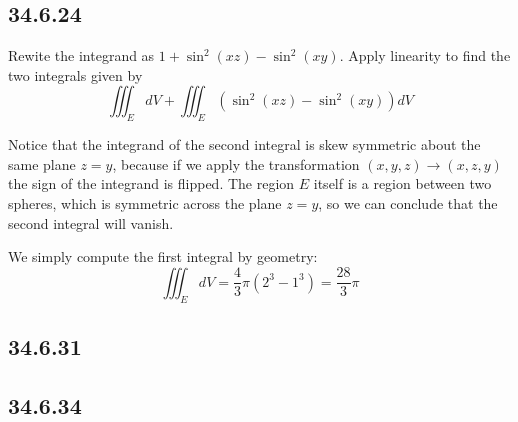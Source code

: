 \documentclass{article}
\begin{document}
\subsection{34.6.24}

Rewite the integrand as $1+\sin^2(xz) - \sin^2(xy)$. Apply linearity to find the two integrals given by $$\iiint_E  dV + \iiint_E (\sin^2(xz) - \sin^2(xy)) dV$$

Notice that the integrand of the second integral is skew symmetric about the same plane $z=y$, because if we apply the transformation $(x,y,z)\to (x,z,y)$ the sign of the integrand is flipped. The region $E$ itself is a region between two spheres, which is symmetric across the plane $z=y$, so we can conclude that the second integral will vanish. 

We simply compute the first integral by geometry: $$\iiint_E  dV = \frac{4}{3}\pi (2^3-1^3) = \frac{28}{3}\pi$$

\subsection{34.6.31}

\subsection{34.6.34}
\end{document}
